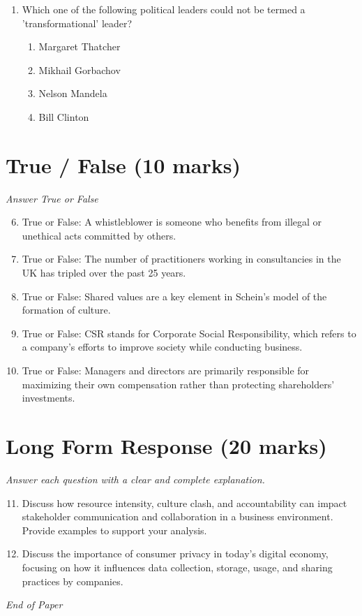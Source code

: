 \documentclass[12pt]{article}
\begin{document}
\begin{enumerate}[label=\arabic*.]
\begin{enumerate}[label=(\alph*)]
    \item Strengths, weaknesses, opportunities, threats.
    \item Strategy, work, openness, toughness.
    \item Strategy, weakness, opinions, tactics.
    \item Strategy, working, opinion, tactical.
\end{enumerate}
\item Which one of the following political leaders could not be termed a 'transformational' leader?
\begin{enumerate}[label=(\alph*)]
    \item Margaret Thatcher
    \item Mikhail Gorbachov
    \item Nelson Mandela
    \item Bill Clinton
\end{enumerate}
\end{enumerate}

\section*{True / False (10 marks)}
\textit{Answer True or False}
\begin{enumerate}[label=\arabic*.]
\setcounter{enumi}{5}
\item True or False: A whistleblower is someone who benefits from illegal or unethical acts committed by others.
\item True or False: The number of practitioners working in consultancies in the UK has tripled over the past 25 years.
\item True or False: Shared values are a key element in Schein's model of the formation of culture.
\item True or False: CSR stands for Corporate Social Responsibility, which refers to a company's efforts to improve society while conducting business.
\item True or False: Managers and directors are primarily responsible for maximizing their own compensation rather than protecting shareholders' investments.
\end{enumerate}

\section*{Long Form Response (20 marks)}
\textit{Answer each question with a clear and complete explanation.}
\begin{enumerate}[label=\arabic*.]
\setcounter{enumi}{10}
\item Discuss how resource intensity, culture clash, and accountability can impact stakeholder communication and collaboration in a business environment. Provide examples to support your analysis.
\item Discuss the importance of consumer privacy in today's digital economy, focusing on how it influences data collection, storage, usage, and sharing practices by companies.
\end{enumerate}

\vfill
\noindent\textit{End of Paper}
\end{document}
